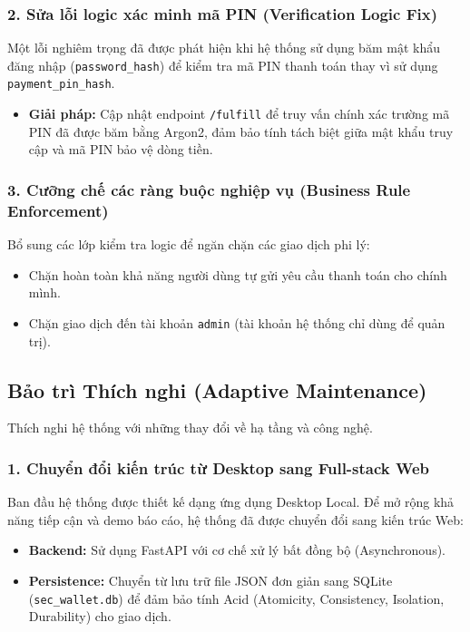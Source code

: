 \documentclass[11pt,a4paper]{article}
\begin{document}
\subsubsection{2. Sửa lỗi logic xác minh mã PIN (Verification Logic Fix)}
Một lỗi nghiêm trọng đã được phát hiện khi hệ thống sử dụng băm mật khẩu đăng nhập (\texttt{password\_hash}) để kiểm tra mã PIN thanh toán thay vì sử dụng \texttt{payment\_pin\_hash}.
\begin{itemize}
    \item \textbf{Giải pháp:} Cập nhật endpoint \texttt{/fulfill} để truy vấn chính xác trường mã PIN đã được băm bằng Argon2, đảm bảo tính tách biệt giữa mật khẩu truy cập và mã PIN bảo vệ dòng tiền.
\end{itemize}

\subsubsection{3. Cưỡng chế các ràng buộc nghiệp vụ (Business Rule Enforcement)}
Bổ sung các lớp kiểm tra logic để ngăn chặn các giao dịch phi lý:
\begin{itemize}
    \item Chặn hoàn toàn khả năng người dùng tự gửi yêu cầu thanh toán cho chính mình.
    \item Chặn giao dịch đến tài khoản \texttt{admin} (tài khoản hệ thống chỉ dùng để quản trị).
\end{itemize}

\subsection{Bảo trì Thích nghi (Adaptive Maintenance)}
Thích nghi hệ thống với những thay đổi về hạ tầng và công nghệ.

\subsubsection{1. Chuyển đổi kiến trúc từ Desktop sang Full-stack Web}
Ban đầu hệ thống được thiết kế dạng ứng dụng Desktop Local. Để mở rộng khả năng tiếp cận và demo báo cáo, hệ thống đã được chuyển đổi sang kiến trúc Web:
\begin{itemize}
    \item \textbf{Backend:} Sử dụng FastAPI với cơ chế xử lý bất đồng bộ (Asynchronous).
    \item \textbf{Persistence:} Chuyển từ lưu trữ file JSON đơn giản sang SQLite (\texttt{sec\_wallet.db}) để đảm bảo tính Acid (Atomicity, Consistency, Isolation, Durability) cho giao dịch.
\end{itemize}
\end{document}
